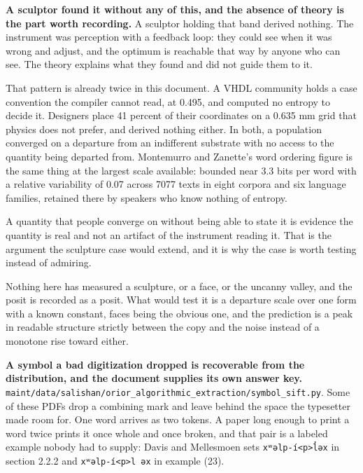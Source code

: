 \textbf{A sculptor found it without any of this, and the absence of theory is the part worth recording.} A sculptor holding that band derived nothing. The instrument was perception with a feedback loop: they could see when it was wrong and adjust, and the optimum is reachable that way by anyone who can see. The theory explains what they found and did not guide them to it.

That pattern is already twice in this document. A VHDL community holds a case convention the compiler cannot read, at 0.495, and computed no entropy to decide it. Designers place 41 percent of their coordinates on a 0.635 mm grid that physics does not prefer, and derived nothing either. In both, a population converged on a departure from an indifferent substrate with no access to the quantity being departed from. Montemurro and Zanette's word ordering figure is the same thing at the largest scale available: bounded near 3.3 bits per word with a relative variability of 0.07 across 7077 texts in eight corpora and six language families, retained there by speakers who know nothing of entropy.

A quantity that people converge on without being able to state it is evidence the quantity is real and not an artifact of the instrument reading it. That is the argument the sculpture case would extend, and it is why the case is worth testing instead of admiring.

Nothing here has measured a sculpture, or a face, or the uncanny valley, and the posit is recorded as a posit. What would test it is a departure scale over one form with a known constant, faces being the obvious one, and the prediction is a peak in readable structure strictly between the copy and the noise instead of a monotone rise toward either.

\textbf{A symbol a bad digitization dropped is recoverable from the distribution, and the document supplies its own answer key.} \texttt{maint/\allowbreak{}data/\allowbreak{}salishan/\allowbreak{}orior\_\allowbreak{}algorithmic\_\allowbreak{}extraction/\allowbreak{}symbol\_\allowbreak{}sift.\allowbreak{}py}. Some of these PDFs drop a combining mark and leave behind the space the typesetter made room for. One word arrives as two tokens. A paper long enough to print a word twice prints it once whole and once broken, and that pair is a labeled example nobody had to supply: Davis and Mellesmoen sets \texttt{xʷəlp-\allowbreak{}í<p>l̓əx} in section 2.2.2 and \texttt{xʷəlp-\allowbreak{}í<p>l əx} in example (23).

